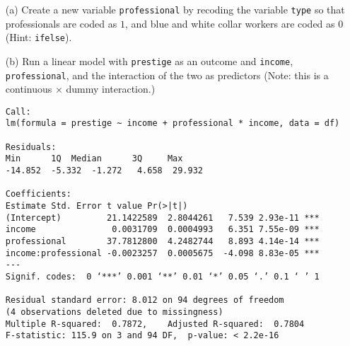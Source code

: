 \documentclass[12pt,letterpaper]{article}
\begin{document}
\newpage
\begin{enumerate}
	
	\item [(a)]
	Create a new variable \texttt{professional} by recoding the variable \texttt{type} so that professionals are coded as $1$, and blue and white collar workers are coded as $0$ (Hint: \texttt{ifelse}).
	
	
	\vspace{0.6cm}
	
	
	\item [(b)]
	Run a linear model with \texttt{prestige} as an outcome and \texttt{income}, \texttt{professional}, and the interaction of the two as predictors (Note: this is a continuous $\times$ dummy interaction.)
	
	\begin{BVerbatim}
Call:
lm(formula = prestige ~ income + professional * income, data = df)

Residuals:
Min      1Q  Median      3Q     Max 
-14.852  -5.332  -1.272   4.658  29.932 

Coefficients:
Estimate Std. Error t value Pr(>|t|)    
(Intercept)         21.1422589  2.8044261   7.539 2.93e-11 ***
income               0.0031709  0.0004993   6.351 7.55e-09 ***
professional        37.7812800  4.2482744   8.893 4.14e-14 ***
income:professional -0.0023257  0.0005675  -4.098 8.83e-05 ***
---
Signif. codes:  0 ‘***’ 0.001 ‘**’ 0.01 ‘*’ 0.05 ‘.’ 0.1 ‘ ’ 1

Residual standard error: 8.012 on 94 degrees of freedom
(4 observations deleted due to missingness)
Multiple R-squared:  0.7872,	Adjusted R-squared:  0.7804 
F-statistic: 115.9 on 3 and 94 DF,  p-value: < 2.2e-16
	\end{BVerbatim}
	

\end{enumerate}
\end{document}
